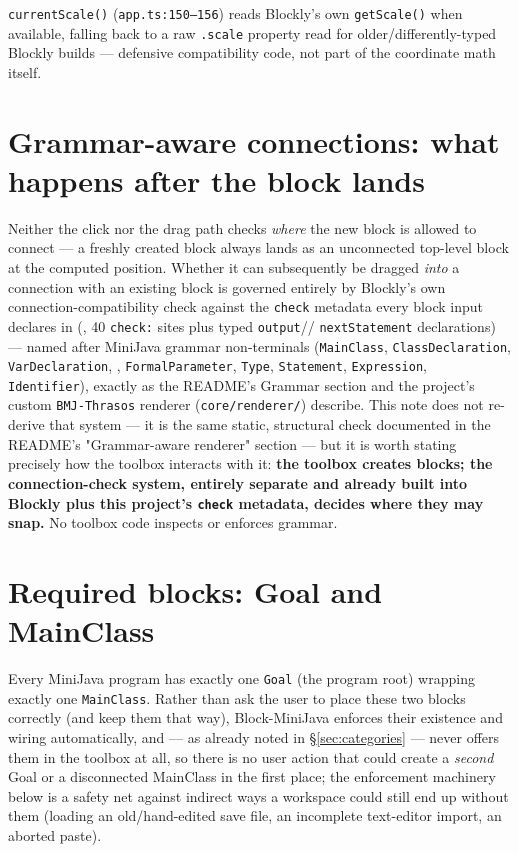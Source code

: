 \documentclass[11pt]{article}
\begin{document}
\texttt{currentScale()} (\texttt{app.ts:150--156}) reads Blockly's own
\texttt{getScale()} when available, falling back to a raw \texttt{.scale}
property read for older/differently-typed Blockly builds --- defensive
compatibility code, not part of the coordinate math itself.

\section{Grammar-aware connections: what happens after the block lands}
\label{sec:connections}

Neither the click nor the drag path checks \emph{where} the new block is
allowed to connect --- a freshly created block always lands as an
unconnected top-level block at the computed position. Whether it can
subsequently be dragged \emph{into} a connection with an existing block is
governed entirely by Blockly's own connection-compatibility check against
the \texttt{check} metadata every block input declares in
\texttt{} (\texttt{}, 40
\texttt{check:} sites plus typed \texttt{output}/\texttt{}/
\texttt{nextStatement} declarations) --- named after MiniJava grammar
non-terminals (\texttt{MainClass}, \texttt{ClassDeclaration},
\texttt{VarDeclaration}, \texttt{},
\texttt{FormalParameter}, \texttt{Type}, \texttt{Statement},
\texttt{Expression}, \texttt{Identifier}), exactly as the README's Grammar
section and the project's custom \texttt{BMJ-Thrasos} renderer
(\texttt{core/renderer/}) describe. This note does not re-derive that
system --- it is the same static, structural check documented in the
README's "Grammar-aware renderer" section --- but it is worth stating
precisely how the toolbox interacts with it: \textbf{the toolbox creates
blocks; the connection-check system, entirely separate and already built
into Blockly plus this project's \texttt{check} metadata, decides where
they may snap.} No toolbox code inspects or enforces grammar.

\section{Required blocks: Goal and MainClass}
\label{sec:required}

Every MiniJava program has exactly one \texttt{Goal} (the program root)
wrapping exactly one \texttt{MainClass}. Rather than ask the user to place
these two blocks correctly (and keep them that way), Block-MiniJava
enforces their existence and wiring automatically, and --- as already
noted in \S\ref{sec:categories} --- never offers them in the toolbox at
all, so there is no user action that could create a \emph{second} Goal or
a disconnected MainClass in the first place; the enforcement machinery
below is a safety net against indirect ways a workspace could still end up
without them (loading an old/hand-edited save file, an incomplete
text-editor import, an aborted paste).
\end{document}
